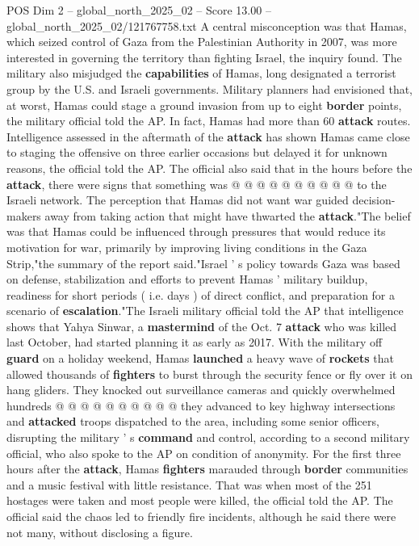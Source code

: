 \begin{textsample}{POS Dim 2 – global\_north\_2025\_02 – Score 13.00 – global\_north\_2025\_02/121767758.txt}
A central misconception was that Hamas, which seized control of Gaza from the Palestinian Authority in 2007, was more interested in governing the territory than fighting Israel, the inquiry found.
The military also misjudged the \textbf{capabilities} of Hamas, long designated a terrorist group by the U.S. and Israeli governments.
Military planners had envisioned that, at worst, Hamas could stage a ground invasion from up to eight \textbf{border} points, the military official told the AP.
In fact, Hamas had more than 60 \textbf{attack} routes.
Intelligence assessed in the aftermath of the \textbf{attack} has shown Hamas came close to staging the offensive on three earlier occasions but delayed it for unknown reasons, the official told the AP.
The official also said that in the hours before the \textbf{attack}, there were signs that something was @ @ @ @ @ @ @ @ @ @ to the Israeli network.
The perception that Hamas did not want war guided decision-makers away from taking action that might have thwarted the \textbf{attack}."The belief was that Hamas could be influenced through pressures that would reduce its motivation for war, primarily by improving living conditions in the Gaza Strip,"the summary of the report said."Israel ' s policy towards Gaza was based on defense, stabilization and efforts to prevent Hamas ' military buildup, readiness for short periods ( i.e. days ) of direct conflict, and preparation for a scenario of \textbf{escalation}."The Israeli military official told the AP that intelligence shows that Yahya Sinwar, a \textbf{mastermind} of the Oct. 7 \textbf{attack} who was killed last October, had started planning it as early as 2017.
With the military off \textbf{guard} on a holiday weekend, Hamas \textbf{launched} a heavy wave of \textbf{rockets} that allowed thousands of \textbf{fighters} to burst through the security fence or fly over it on hang gliders.
They knocked out surveillance cameras and quickly overwhelmed hundreds @ @ @ @ @ @ @ @ @ @ they advanced to key highway intersections and \textbf{attacked} troops dispatched to the area, including some senior officers, disrupting the military ' s \textbf{command} and control, according to a second military official, who also spoke to the AP on condition of anonymity.
For the first three hours after the \textbf{attack}, Hamas \textbf{fighters} marauded through \textbf{border} communities and a music festival with little resistance.
That was when most of the 251 hostages were taken and most people were killed, the official told the AP.
The official said the chaos led to friendly fire incidents, although he said there were not many, without disclosing a figure.

\end{textsample}
